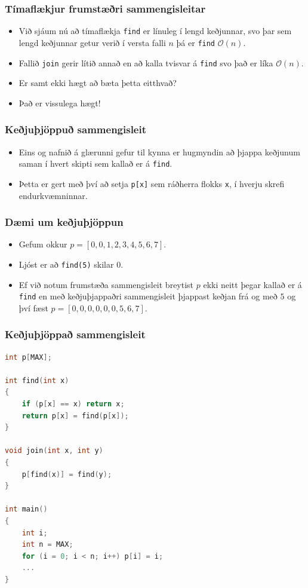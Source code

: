 \documentclass{beamer}
\begin{document}
\begin{frame}
\frametitle{Tímaflækjur frumstæðri sammengisleitar}
\begin{itemize}
	\item<1-> Við sjáum nú að tímaflækja \texttt{find} er línuleg í lengd keðjunnar, svo 
		þar sem lengd keðjunnar getur verið í versta falli $n$ þá er \texttt{find} $\mathcal{O}(n)$.
	\item<2-> Fallið \texttt{join} gerir lítið annað en að kalla tvisvar á \texttt{find} svo það er líka
		$\mathcal{O}(n)$.
	\item<3-> Er samt ekki hægt að bæta þetta eitthvað?
	\item<4-> Það er vissulega hægt!
\end{itemize}
\end{frame}

\begin{frame}
\frametitle{Keðjuþjöppuð sammengisleit}
\begin{itemize}
	\item<1-> Eins og nafnið á glærunni gefur til kynna er hugmyndin að þjappa keðjunum saman í hvert skipti sem kallað er á
		\texttt{find}.
	\item<2-> Þetta er gert með því að setja \texttt{p[x]} sem ráðherra flokks \texttt{x}, í hverju skrefi endurkvæmninnar.
\end{itemize}
\end{frame}

\begin{frame}
\frametitle{Dæmi um keðjuþjöppun}
\begin{itemize}
	\item<1-> Gefum okkur
		$p = [0, 0, 1, 2, 3, 4, 5, 6, 7]$.
	\item<2-> Ljóst er að \texttt{find(5)} skilar $0$.
	\item<3-> Ef við notum frumstæða sammengisleit breytist $p$ ekki neitt þegar kallað er á \texttt{find}
		en með keðjuþjappaðri sammengisleit þjappast keðjan frá og með $5$ og því fæst
		$p = [0, 0, 0, 0, 0, 0, 5, 6, 7]$.
\end{itemize}
\end{frame}

\begin{frame}[fragile]
	\frametitle{Keðjuþjöppað sammengisleit}
\tiny
\begin{lstlisting}[language=C++]
int p[MAX];

int find(int x)
{
	if (p[x] == x) return x;
	return p[x] = find(p[x]);
}

void join(int x, int y)
{
	p[find(x)] = find(y);
}

int main()
{
	int i;
	int n = MAX;
	for (i = 0; i < n; i++) p[i] = i;
	...
}
\end{lstlisting}
\end{frame}
\end{document}
